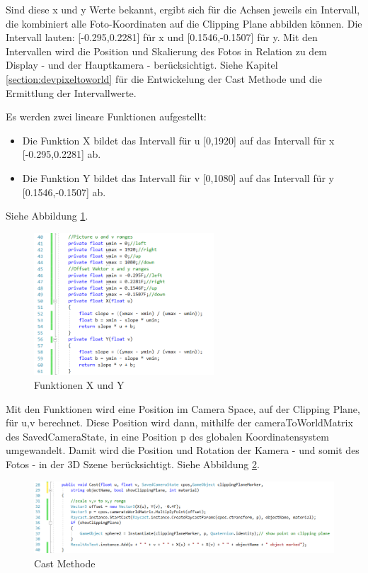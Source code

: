 Sind diese x und y Werte bekannt, ergibt sich für die Achsen jeweils ein Intervall, die kombiniert alle Foto-Koordinaten auf die Clipping Plane abbilden können. Die Intervall lauten: [-0.295,0.2281] für x und [0.1546,-0.1507] für y. Mit den Intervallen wird die Position und Skalierung des Fotos in Relation zu dem Display - und der Hauptkamera - berücksichtigt. Siehe Kapitel \ref{section:devpixeltoworld} für die Entwickelung der Cast Methode und die Ermittlung der Intervallwerte.

Es werden zwei lineare Funktionen aufgestellt:
\begin{itemize}
	\item Die Funktion X bildet das Intervall für u [0,1920] auf das Intervall für x [-0.295,0.2281] ab.
	\item Die Funktion Y bildet das Intervall für v [0,1080] auf das Intervall für y [0.1546,-0.1507] ab.
\end{itemize}
Siehe Abbildung \ref{code:uvtoxy}.
\begin{figure}[H]
	\centering
	\includegraphics[width=0.6\textwidth]{images/code_uv_to_xy_scale.PNG}
	\caption[]{Funktionen X und Y}
	\label{code:uvtoxy}
\end{figure}

Mit den Funktionen wird eine Position im Camera Space, auf der Clipping Plane, für u,v berechnet. Diese Position wird dann, mithilfe der cameraToWorldMatrix des SavedCameraState, in eine Position p des globalen Koordinatensystem umgewandelt. Damit wird die Position und Rotation der Kamera - und somit des Fotos - in der 3D Szene berücksichtigt. Siehe Abbildung \ref{code:castmethod}.

\begin{figure}[H]
	\centering
	\includegraphics[width=1.2\textwidth]{images/code_cast_method.PNG}
	\caption[]{Cast Methode}
	\label{code:castmethod}
\end{figure}
